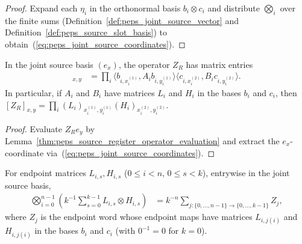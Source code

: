 \begin{proof}\leanok
    Expand each $\eta_i$ in the orthonormal basis $b_i\otimes c_i$ and distribute
    $\bigotimes_i$ over the finite sums (Definition~\ref{def:peps_joint_source_vector}
    and Definition~\ref{def:peps_source_slot_basis}) to obtain~(\ref{eq:peps_joint_source_coordinates}).
\end{proof}

\begin{lemma}
    \label{thm:peps_endpoint_operator_coordinates}
    \leanok
    In the joint source basis $(e_x)$, the operator $Z_R$ has matrix entries
    \begin{align}
        [Z_R]_{x,y} & =\prod_i
        \langle b_{i,x_i^{(1)}},A_i b_{i,y_i^{(1)}}\rangle
        \langle c_{i,x_i^{(2)}},B_i c_{i,y_i^{(2)}}\rangle.
        \label{eq:peps_endpoint_coordinates}
    \end{align}
    In particular, if $A_i$ and $B_i$ have matrices $L_i$ and $H_i$ in the
    bases $b_i$ and $c_i$, then
    $[Z_R]_{x,y}=\prod_i (L_i)_{x_i^{(1)},y_i^{(1)}}(H_i)_{x_i^{(2)},y_i^{(2)}}$.
\end{lemma}

\begin{proof}\leanok
    Evaluate $Z_R e_y$ by Lemma~\ref{thm:peps_source_register_operator_evaluation}
    and extract the $e_x$-coordinate
    via~(\ref{eq:peps_joint_source_coordinates}).
\end{proof}

\begin{lemma}
    \label{thm:peps_endpoint_matrix_average}
    \leanok
    For endpoint matrices $L_{i,s},H_{i,s}$ ($0\le i<n$, $0\le s<k$), entrywise
    in the joint source basis,
    \begin{align}
        \bigotimes_{i=0}^{n-1}
        \left(k^{-1}\sum_{s=0}^{k-1} L_{i,s}\otimes H_{i,s}\right)
         & =k^{-n}\sum_{j:\{0,\ldots,n-1\}\to\{0,\ldots,k-1\}} Z_j,
        \label{eq:peps_endpoint_average}
    \end{align}
    where $Z_j$ is the endpoint word whose endpoint maps have matrices
    $L_{i,j(i)}$ and $H_{i,j(i)}$ in the bases $b_i$ and $c_i$ (with $0^{-1}=0$
    for $k=0$).
\end{lemma}

